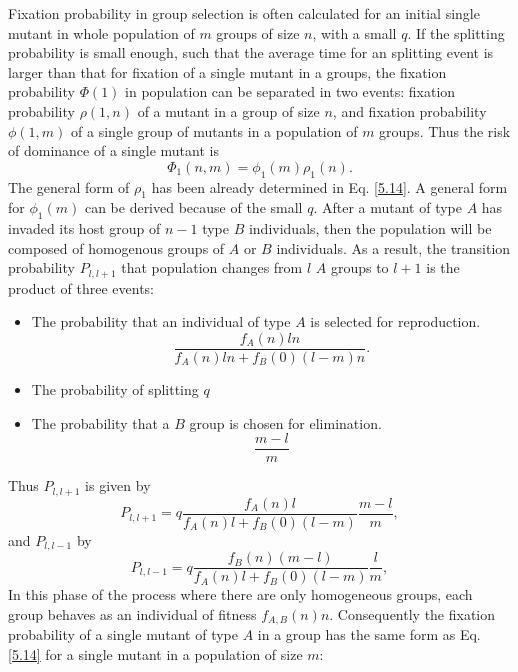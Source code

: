  Fixation probability in group selection is often calculated for an initial single mutant in whole population of $m$ groups of size $n$, with a small $q$\cite{Shoresh2011,Traulsen2006a}. If the splitting probability is small enough, such that the average time for an splitting event is larger than that for fixation of a single mutant in a groups, the fixation probability $\Phi(1)$ in population can be separated in two events: fixation probability $\rho(1,n)$ of a mutant in a group of size $n$, and    fixation probability $\phi(1,m)$ of a single group of mutants in a population of $m$ groups. Thus the risk of dominance of a single mutant is
\begin{equation}
\Phi_1(n,m)=\phi_1(m)\rho_1(n).
\end{equation}
The general form of $\rho_1$ has been already determined in Eq. \eqref{5.14}. A general form for $\phi_1(m)$ can be derived because of the small $q$.
After a mutant of type $A$ has invaded its host group of $n-1$ type $B$ individuals, then the population will be composed  of homogenous groups of $A$ or $B$ individuals. As a result, the transition probability $P_{l,l+1}$ that population changes from $l$ $A$ groups to $l+1$ is the product  of three events:
\begin{itemize}
\item The probability that an individual of type $A$ is selected for reproduction. 
\begin{equation}
\frac{f_A(n)ln}{f_A(n)ln+f_B(0)(l-m)n}.
\end{equation}
\item The probability of splitting $q$
\item The probability that a $B$ group is chosen for elimination.
\begin{equation}
\frac{m-l}{m}
\end{equation}
\end{itemize}
Thus $P_{l,l+1}$ is given by
\begin{equation}
P_{l,l+1}=q\frac{f_A(n)l}{f_A(n)l+f_B(0)(l-m)}\frac{m-l}{m},
\end{equation}
and  $P_{l,l-1}$ by
\begin{equation}
P_{l,l-1}=q\frac{f_B(n)(m-l)}{f_A(n)l+f_B(0)(l-m)}\frac{l}{m},
\end{equation}
In this phase of the process where there are only  homogeneous groups, each group behaves as an individual of fitness $f_{A,B}(n)n$. Consequently the fixation probability of a single mutant of type $A$ in a group has the same form as Eq. \eqref{5.14} for a single mutant in a population of size $m$: 
